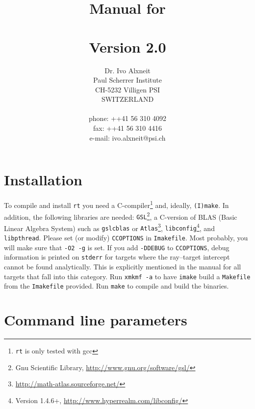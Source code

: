 \documentclass[10pt,a4paper,titlepage]{article}
\title{ {\Huge Manual for \\
		\rt \\
		Version 2.0\\
		\vspace{2cm}}}
\author{Dr. Ivo Alxneit \\
	Paul Scherrer Institute \\
	CH-5232 Villigen PSI \\
	SWITZERLAND \\
	\\
	phone: ++41 56 310 4092 \\
	fax: ++41 56 310 4416 \\
	e-mail: ivo.alxneit@psi.ch \\
	\vspace{4cm}}
\newcommand{\rt}{{\tt rt} }
\begin{document}
\maketitle

\tableofcontents
\pagebreak

\setcounter{page}{1}



\section{Installation}

To compile and install \rt you need a C-compiler\footnote{\rt is only tested with gcc} and, ideally, {\tt (I)make}. In addition, the following libraries are needed: {\tt GSL}\footnote{Gnu Scientific Library, \url{http://www.gnu.org/software/gsl/}}, a C-version of BLAS (Basic Linear Algebra System) such as {\tt gslcblas} or {\tt Atlas}\footnote{\url{http://math-atlas.sourceforge.net/}}, {\tt libconfig}\footnote{Version 1.4.6+, \url{http://www.hyperrealm.com/libconfig/}}, and {\tt libpthread}. Please set (or modify) {\tt CCOPTIONS} in {\tt Imakefile}. Most probably, you will make sure that {\tt -O2 -g} is set. If you add {\tt -DDEBUG} to {\tt CCOPTIONS}, debug information is printed on {\tt stderr} for targets where the ray--target intercept cannot be found analytically. This is explicitly mentioned in the manual for all targets that fall into this category. Run {\tt xmkmf -a} to have {\tt imake} build a {\tt Makefile} from the {\tt Imakefile} provided. Run {\tt make} to compile and build the binaries.



\section{Command line parameters}
\end{document}
